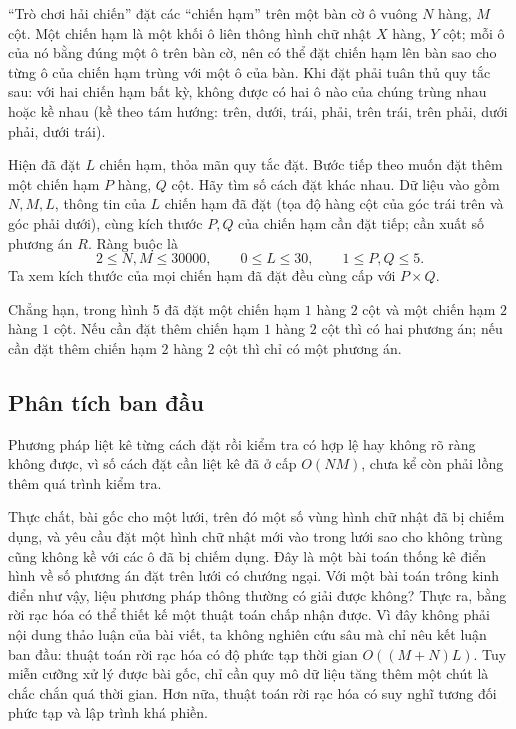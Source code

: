 \documentclass[11pt]{article}
\begin{document}
``Trò chơi hải chiến'' đặt các ``chiến hạm'' trên một bàn cờ ô vuông
\(N\) hàng, \(M\) cột. Một chiến hạm là một khối ô liên thông hình chữ
nhật \(X\) hàng, \(Y\) cột; mỗi ô của nó bằng đúng một ô trên bàn cờ, nên
có thể đặt chiến hạm lên bàn sao cho từng ô của chiến hạm trùng với một
ô của bàn. Khi đặt phải tuân thủ quy tắc sau: với hai chiến hạm bất kỳ,
không được có hai ô nào của chúng trùng nhau hoặc kề nhau (kề theo tám
hướng: trên, dưới, trái, phải, trên trái, trên phải, dưới phải, dưới
trái).

Hiện đã đặt \(L\) chiến hạm, thỏa mãn quy tắc đặt. Bước tiếp theo muốn
đặt thêm một chiến hạm \(P\) hàng, \(Q\) cột. Hãy tìm số cách đặt khác
nhau. Dữ liệu vào gồm \(N,M,L\), thông tin của \(L\) chiến hạm đã đặt
(tọa độ hàng cột của góc trái trên và góc phải dưới), cùng kích thước
\(P,Q\) của chiến hạm cần đặt tiếp; cần xuất số phương án \(R\). Ràng
buộc là
\[
  2 \le N,M \le 30000,\qquad 0 \le L \le 30,\qquad 1 \le P,Q \le 5.
\]
Ta xem kích thước của mọi chiến hạm đã đặt đều cùng cấp với \(P\times Q\).

Chẳng hạn, trong hình 5 đã đặt một chiến hạm \(1\) hàng \(2\) cột và một
chiến hạm \(2\) hàng \(1\) cột. Nếu cần đặt thêm chiến hạm \(1\) hàng
\(2\) cột thì có hai phương án; nếu cần đặt thêm chiến hạm \(2\) hàng
\(2\) cột thì chỉ có một phương án.

\subsection{Phân tích ban đầu}

Phương pháp liệt kê từng cách đặt rồi kiểm tra có hợp lệ hay không rõ
ràng không được, vì số cách đặt cần liệt kê đã ở cấp \(O(NM)\), chưa kể
còn phải lồng thêm quá trình kiểm tra.

Thực chất, bài gốc cho một lưới, trên đó một số vùng hình chữ nhật đã bị
chiếm dụng, và yêu cầu đặt một hình chữ nhật mới vào trong lưới sao cho
không trùng cũng không kề với các ô đã bị chiếm dụng. Đây là một bài toán
thống kê điển hình về số phương án đặt trên lưới có chướng ngại. Với một
bài toán trông kinh điển như vậy, liệu phương pháp thông thường có giải
được không? Thực ra, bằng rời rạc hóa có thể thiết kế một thuật toán chấp
nhận được. Vì đây không phải nội dung thảo luận của bài viết, ta không
nghiên cứu sâu mà chỉ nêu kết luận ban đầu: thuật toán rời rạc hóa có độ
phức tạp thời gian \(O((M+N)L)\). Tuy miễn cưỡng xử lý được bài gốc, chỉ
cần quy mô dữ liệu tăng thêm một chút là chắc chắn quá thời gian. Hơn
nữa, thuật toán rời rạc hóa có suy nghĩ tương đối phức tạp và lập trình
khá phiền.
\end{document}

